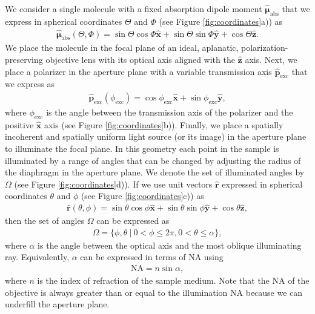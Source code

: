 \documentclass[10pt]{article}
\providecommand{\mb}[1]{\mathbf{#1}}
\providecommand{\mh}[1]{\mathbf{\hat{#1}}}
\providecommand{\bs}[1]{\boldsymbol{#1}}
\begin{document}
We consider a single molecule with a fixed absorption dipole moment
$\hat{\bs{\mu}}_{\text{abs}}$ that we express in spherical coordinates $\Theta$
and $\Phi$ (see Figure \ref{fig:coordinates}a)) as
\begin{align}
  \hat{\bs{\mu}}_{\text{abs}}(\Theta, \Phi) = \sin\Theta\cos\Phi\hat{\mb{x}} + \sin\Theta\sin\Phi\hat{\mb{y}} + \cos\Theta\hat{\mb{z}} \label{eq:mu}.
\end{align}
We place the molecule in the focal plane of an ideal, aplanatic,
polarization-preserving objective lens with its optical axis aligned with the
$\mh{z}$ axis. Next, we place a polarizer in the aperture plane with a variable
transmission axis $\hat{\mb{p}}_{\text{exc}}$ that we express as
\begin{align}
 \hat{\mb{p}}_{\text{exc}}(\phi_{\text{exc}}) = \cos\phi_{\text{exc}}\hat{\mb{x}} +
\sin\phi_{\text{exc}}\hat{\mb{y}},\label{eq:excfield}
\end{align}
where $\phi_{\text{exc}}$ is the angle between the transmission axis of the
polarizer and the positive $\mh{x}$ axis (see Figure
\ref{fig:coordinates}b)). Finally, we place a spatially incoherent and spatially
uniform light source (or its image) in the aperture plane to illuminate the
focal plane. In this geometry each point in the sample is illuminated by a range
of angles that can be changed by adjusting the radius of the diaphragm in the
aperture plane. We denote the set of illuminated angles by $\Omega$ (see Figure
\ref{fig:coordinates}d)). If we use unit vectors $\hat{\mb{r}}$ expressed in
spherical coordinates $\theta$ and $\phi$ (see Figure \ref{fig:coordinates}c))
as
  \begin{align}
   \hat{\mb{r}}(\theta, \phi) = \sin\theta\cos\phi\hat{\mb{x}} + \sin\theta\sin\phi\hat{\mb{y}} + \cos\theta\hat{\mb{z}}, 
  \end{align}
  then the set of angles $\Omega$ can be expressed as
  \begin{align}
  \Omega = \{\phi, \theta\ |\ 0 < \phi \leq 2\pi, 0 < \theta \leq \alpha\},
  \end{align}
  where $\alpha$ is the angle between the optical axis and the most oblique
  illuminating ray. Equivalently, $\alpha$ can be expressed in terms of NA using
  \begin{align}
    \text{NA} = n\sin\alpha, 
  \end{align}
  where $n$ is the index of refraction of the sample medium. Note that the NA of
  the objective is always greater than or equal to the illumination NA because
  we can underfill the aperture plane.
  
\end{document}
